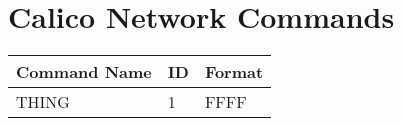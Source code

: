 
\section{Calico Network Commands}
\begin{table}[h]
  \begin{tabular}{ | l | l | l | }
  \hline
  \textbf{Command Name} & \textbf{ID} & \textbf{Format} \\ 
  \hline
  THING & 1 & FFFF \\
  \hline
  \end{tabular}
\end{table}